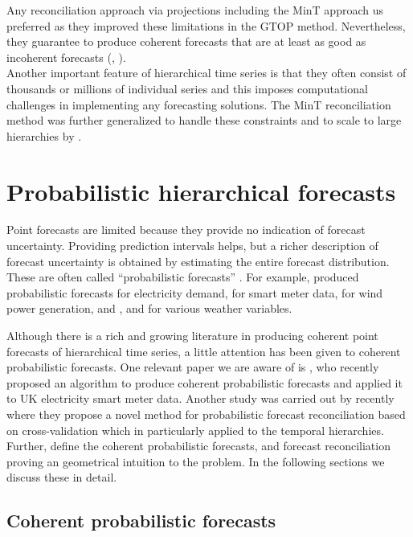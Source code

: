 \documentclass[graybox]{svmult}
\begin{document}
Any reconciliation approach via projections including the MinT approach us preferred as they improved these limitations in the GTOP method. Nevertheless, they guarantee to produce coherent forecasts that are at least as good as incoherent forecasts (\cite{Wickramasuriya2018}, \cite{Gamakumara2018}). \\


Another important feature of hierarchical time series is that they often consist of thousands or millions of individual series and this imposes computational challenges in implementing any forecasting solutions. The MinT reconciliation method was further generalized to handle these constraints and to scale to large hierarchies by \cite{Wickramasuriya2018}. \\

\section{Probabilistic hierarchical forecasts}

Point forecasts are limited because they provide no indication of forecast uncertainty. Providing prediction intervals helps, but a richer description of forecast uncertainty is obtained by estimating the entire forecast distribution. These are often called ``probabilistic forecasts'' \citep{Gneiting2014}. For example, \citet{McSharry2005} produced probabilistic forecasts for electricity demand, \citet{BenTaieb2017} for smart meter data, \citet{Pinson2009} for wind power generation, and \citet{Gel2004}, \citet{Gneiting2005a} and \citet{Gneiting2005} for various weather variables.

Although there is a rich and growing literature in producing coherent point forecasts of hierarchical time series, a little  attention has been given to coherent probabilistic forecasts. One relevant paper we are aware of is \cite{Taieb2017}, who recently proposed an algorithm to produce coherent probabilistic forecasts and applied it to UK electricity smart meter data. Another study was carried out by \cite{Jeon2018} recently where they propose a novel method for probabilistic forecast reconciliation based on cross-validation which in particularly applied to the temporal hierarchies. Further, \cite{Gamakumara2018} define the coherent probabilistic forecasts, and forecast reconciliation proving an geometrical intuition to the problem. In the following sections we discuss these in detail.  


\subsection{Coherent probabilistic forecasts}
\end{document}
